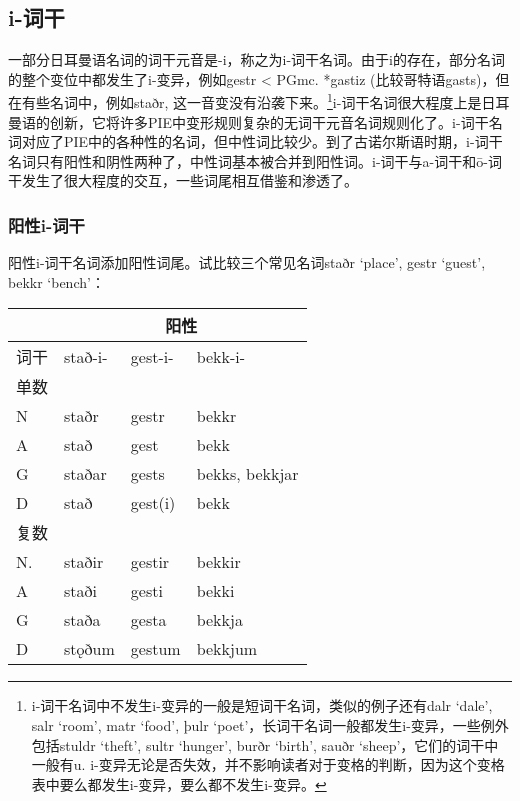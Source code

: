 \subsection{i-词干}
\label{i-词干}

一部分日耳曼语名词的词干元音是-i，称之为i-词干名词。由于i的存在，部分名词的整个变位中都发生了i-变异，例如gestr
\textless{} PGmc. *gastiz (比较哥特语gasts)，但在有些名词中，例如staðr,
这一音变没有沿袭下来。\footnote{i-词干名词中不发生i-变异的一般是短词干名词，类似的例子还有dalr
  `dale', salr `room', matr `food', þulr
  `poet'，长词干名词一般都发生i-变异，一些例外包括stuldr `theft', sultr
  `hunger', burðr `birth', sauðr `sheep'，它们的词干中一般有u.
  i-变异无论是否失效，并不影响读者对于变格的判断，因为这个变格表中要么都发生i-变异，要么都不发生i-变异。}i-词干名词很大程度上是日耳曼语的创新，它将许多PIE中变形规则复杂的无词干元音名词规则化了。i-词干名词对应了PIE中的各种性的名词，但中性词比较少。到了古诺尔斯语时期，i-词干名词只有阳性和阴性两种了，中性词基本被合并到阳性词。i-词干与a-词干和ō-词干发生了很大程度的交互，一些词尾相互借鉴和渗透了。

\subsubsection{阳性i-词干}

阳性i-词干名词添加阳性词尾。试比较三个常见名词staðr `place', gestr
`guest', bekkr `bench'：

\begin{longtable}{llll}
  \toprule
       & \multicolumn{3}{c}{\textbf{阳性}}                            \\
  \midrule
  \endhead
  \bottomrule
  \endfoot
  词干 & stað-i-                           & gest-i- & bekk-i-        \\
  单数 &                                   &         &                \\
  N    & staðr                             & gestr   & bekkr          \\
  A    & stað                              & gest    & bekk           \\
  G    & staðar                            & gests   & bekks, bekkjar \\
  D    & stað                              & gest(i) & bekk           \\
  复数 &                                   &         &                \\
  N.   & staðir                            & gestir  & bekkir         \\
  A    & staði                             & gesti   & bekki          \\
  G    & staða                             & gesta   & bekkja         \\
  D    & stǫðum                            & gestum  & bekkjum        \\
\end{longtable}

